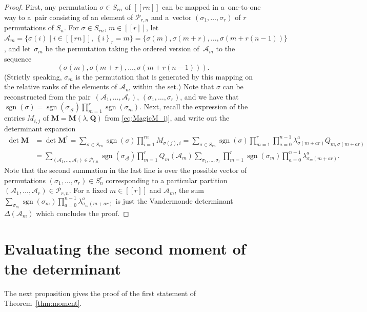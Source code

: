 \documentclass[pdftex]{sigma}
\numberwithin{equation}{section}
\theoremstyle{definition}
\newcommand{\cP}{{\mathcal P}}
\newcommand{\sgn}{\operatorname{sgn}}
\newcommand{\cA}{\mathcal{A}}
\newcommand{\lst}[1]{[\![#1 ]\!]}
\newcommand{\nfr}[2]{\left\{ #1 \right\}_{#2}}
\newcommand{\mbf}[1]{\mathbf{#1}}
\begin{document}
\begin{proof}
First, any permutation $\sigma\in S_{rn}$ of $\lst{rn}$ can be mapped in a~one-to-one way to a~pair consisting of an element of $\cP_{r,n}$ and a~vector $(\sigma_1, \dots, \sigma_r)$ of $r$ permutations of $S_n$. For $\sigma\in S_{rn}$, $m\in \lst{r}$, let
$
 \cA_m=\{\sigma(i) \mid i\in \lst{rn}, \, \nfr{i}{r}=m\} =\{\sigma(m), \sigma(m+r), \dots, \sigma(m+r(n-1))\}$,
and let~$\sigma_m$ be the permutation taking the ordered version of~$\cA_m$ to the sequence
\[(\sigma(m), \sigma(m+r), \dots, \sigma(m+r(n-1))).
\]
(Strictly speaking, $\sigma_m$ is the permutation that is generated by this mapping on the relative ranks of the elements of $\cA_m$ within the set.) Note that $\sigma$ can be reconstructed from the pair~$(\cA_1,\dots, \cA_r)$, $(\sigma_1, \dots, \sigma_r)$, and we have that
$
 \sgn(\sigma)=\sgn(\sigma_{\underline{\cA}}) \prod_{m=1}^r \sgn(\sigma_m)$.
Next, recall the expression of the entries $M_{i,j}$ of $\mbf{M}=\mbf{M}({\lambda}, \mbf{Q})$ from \eqref{eq:MagicM_ij},
 and write out the determinant expansion
 \begin{align*}
 \det \mbf{M}&= \det \mbf{M}^{\dagger}=\sum_{\sigma\in S_{rn}} \sgn(\sigma) \prod_{i=1}^{rn} M_{\sigma(j),i}=\sum_{\sigma\in S_{rn}} \sgn(\sigma) \prod_{m=1}^{r} \prod_{a=0}^{n-1} \lambda_{\sigma(m+ar)}^{a} Q_{m,\sigma(m+ar)}
 \\
 &=\sum_{(\cA_1,\dots,\cA_r)\in \cP_{r,n}}\!\!\sgn(\sigma_{\underline{\cA}}) \prod_{m=1}^r Q_{m}(\cA_m) \sum_{\sigma_1, \dots, \sigma_r} \prod_{m=1}^r \sgn(\sigma_m) \prod_{a=0}^{n-1} \lambda_{\sigma_m(m+a r)}^{a}.
\end{align*}
Note that the second summation in the last line is over the possible vector of permutations $(\sigma_1,\dots,\sigma_r)\in S_n^r$ corresponding to a particular partition $(\cA_1,\dots,\cA_r)\in \cP_{r,n}$. For a fixed $m\in \lst{r}$ and $\cA_m$, the sum $\sum_{\sigma_m} \sgn(\sigma_m) \prod_{a=0}^{n-1} \lambda_{\sigma_m(m+a r)}^{a}$ is just the Vandermonde determinant~$\Delta(\cA_m)$ which
concludes the proof.
\end{proof}



\section{Evaluating the second moment of the determinant}\label{sec:2moment}

The next proposition gives the proof of the first statement of Theorem~\ref{thm:moment}.
\end{document}
